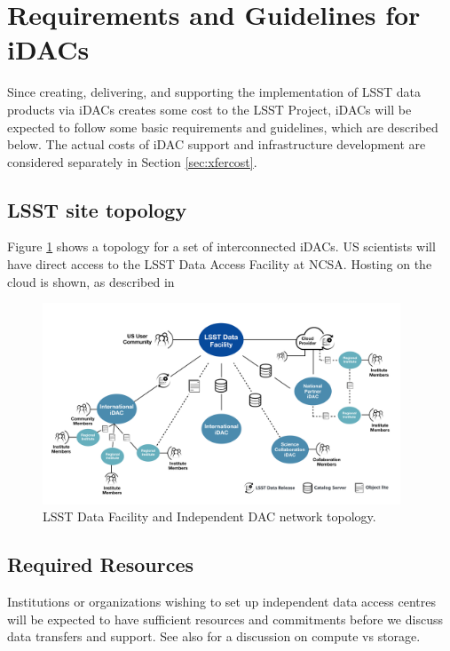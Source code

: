 \section{Requirements and Guidelines for iDACs}\label{sec:reqs}
Since creating, delivering, and supporting the implementation of LSST data products via iDACs creates some cost to the LSST Project, iDACs will be expected to follow some basic requirements and guidelines, which are described below.
The actual costs of iDAC support and infrastructure development are considered separately in Section \ref{sec:xfercost}.

\subsection{LSST site topology} \label{sec:topology}

Figure \ref{fig:idac-topology} shows a  topology for a set of interconnected iDACs.  US scientists will have direct access to the LSST Data Access Facility at NCSA.  Hosting on the cloud is shown, as described in 
	
\begin{figure}
\begin{center}
\includegraphics[width=0.95\textwidth]{images_local/idac-topology}
\caption{LSST Data Facility and Independent DAC network topology.  \label{fig:idac-topology}}
\end{center}
\end{figure}

\subsection{Required Resources} \label{sec:resources}
Institutions or organizations wishing to set up independent data access centres will be expected to have
sufficient resources and commitments before we discuss data transfers and support.
See also  for a discussion on compute vs storage.

